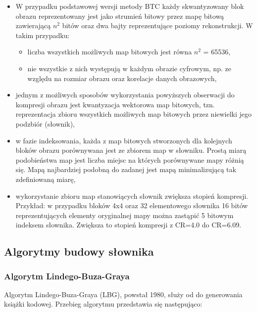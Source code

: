 \documentclass{article}
\begin{document}
\begin{itemize} 
\item W przypadku podstawowej wersji metody BTC każdy skwantyzowany blok obrazu reprezentowany jest jako strumień bitowy przez mapę bitową zawierającą $n^{2}$ bitów oraz dwa bajty reprezentujące poziomy rekonstrukcji. W takim przypadku:
     \begin{itemize}
        \item liczba wszystkich możliwych map bitowych jest równa $n^{2}$ = 65536,
        \item nie wszystkie z nich występują w każdym obrazie cyfrowym, np. ze względu na rozmiar obrazu oraz korelacje danych obrazowych, 
     \end{itemize}
\item jednym z możliwych sposobów wykorzystania powyższych obserwacji do kompresji obrazu jest kwantyzacja wektorowa map bitowych, tzn. reprezentacja zbioru wszystkich możliwych map bitowych przez niewielki jego podzbiór (słownik),
\item w fazie indeksowania, każda z map bitowych stworzonych dla kolejnych bloków obrazu porównywana jest ze zbiorem map w słowniku. Prostą miarą podobieństwa map jest liczba miejsc na których porównywane mapy różnią się. Mapą najbardziej podobną do zadanej jest mapą minimalizującą tak zdefiniowaną miarę,
\item wykorzystanie zbioru map stanowiących słownik zwiększa stopień kompresji. Przykład: w przypadku bloków 4x4 oraz 32 elementowego słownika 16 bitów reprezentujących elementy oryginalnej mapy można zastąpić 5 bitowym indeksem słownika. Zwiększa to stopień kompresji z CR=4.0 do CR=6.09.
\end{itemize}

\subsection{Algorytmy budowy słownika}

\subsubsection{Algorytm Lindego-Buza-Graya}

Algorytm Lindego-Buza-Graya (LBG), powstał 1980, służy od do generowania książki kodowej. Przebieg algorytmu przedstawia się następująco:
\end{document}
